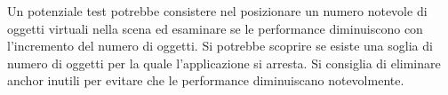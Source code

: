 \documentclass[crop=false, class=book]{standalone}
\begin{document}
	\begin{flushleft}
		Un potenziale test potrebbe consistere nel posizionare un numero notevole di oggetti virtuali nella scena 	ed 					esaminare se le performance diminuiscono con l'incremento del numero di oggetti.  Si potrebbe scoprire se esiste una 			soglia di numero di oggetti  per la quale l'applicazione si arresta. Si consiglia di eliminare anchor inutili per 				evitare che le performance diminuiscano notevolmente.
	\end{flushleft}
			
	
\end{document}
